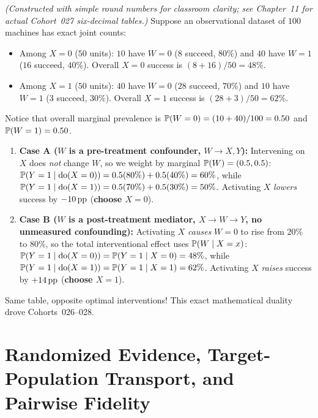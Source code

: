 \begin{pedagogicalexample}
\emph{(Constructed with simple round numbers for classroom clarity; see Chapter~11 for actual Cohort~027 six-decimal tables.)} Suppose an observational dataset of $100$ machines has exact joint counts:
\begin{itemize}
  \item Among $X=0$ ($50$ units): $10$ have $W=0$ ($8$ succeed, $80\%$) and $40$ have $W=1$ ($16$ succeed, $40\%$). Overall $X=0$ success is $(8+16)/50 = 48\%$.
  \item Among $X=1$ ($50$ units): $40$ have $W=0$ ($28$ succeed, $70\%$) and $10$ have $W=1$ ($3$ succeed, $30\%$). Overall $X=1$ success is $(28+3)/50 = 62\%$.
\end{itemize}
Notice that overall marginal prevalence is $\mathbb{P}(W=0) = (10+40)/100 = 0.50$ and $\mathbb{P}(W=1) = 0.50$.
\begin{enumerate}
  \item \textbf{Case A ($W$ is a pre-treatment confounder, $W \to X, Y$):} Intervening on $X$ does \emph{not} change $W$, so we weight by marginal $\mathbb{P}(W)=(0.5, 0.5)$: $\mathbb{P}(Y=1\mid \operatorname{do}(X=0)) = 0.5(80\%) + 0.5(40\%) = 60\%$, while $\mathbb{P}(Y=1\mid \operatorname{do}(X=1)) = 0.5(70\%) + 0.5(30\%) = 50\%$. Activating $X$ \emph{lowers} success by $-10\,\mathrm{pp}$ (\textbf{choose $X=0$}).
  \item \textbf{Case B ($W$ is a post-treatment mediator, $X \to W \to Y$, no unmeasured confounding):} Activating $X$ \emph{causes} $W=0$ to rise from $20\%$ to $80\%$, so the total interventional effect uses $\mathbb{P}(W\mid X=x)$: $\mathbb{P}(Y=1\mid \operatorname{do}(X=0)) = \mathbb{P}(Y=1\mid X=0) = 48\%$, while $\mathbb{P}(Y=1\mid \operatorname{do}(X=1)) = \mathbb{P}(Y=1\mid X=1) = 62\%$. Activating $X$ \emph{raises} success by $+14\,\mathrm{pp}$ (\textbf{choose $X=1$}).
\end{enumerate}
Same table, opposite optimal interventions! This exact mathematical duality drove Cohorts~026--028.
\end{pedagogicalexample}

\section{Randomized Evidence, Target-Population Transport, and Pairwise Fidelity}

